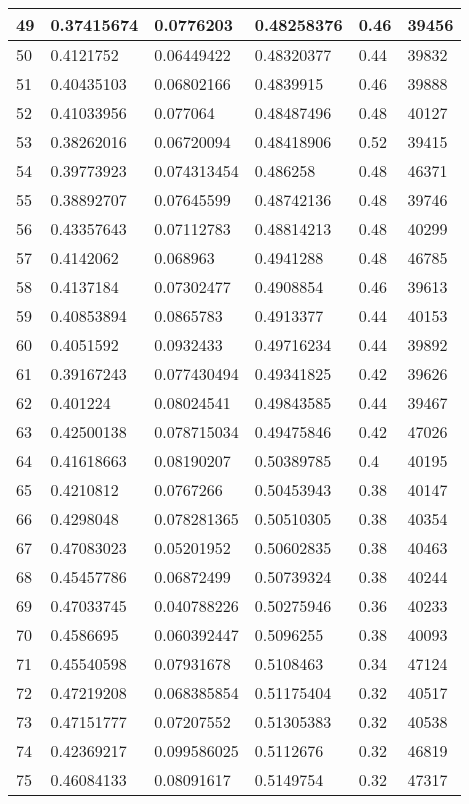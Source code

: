 \begin{longtable}{|l|l|l|l|l|l|}
49 & 0.37415674 & 0.0776203 & 0.48258376 & 0.46 & 39456 \\ \hline 
50 & 0.4121752 & 0.06449422 & 0.48320377 & 0.44 & 39832 \\ \hline 
51 & 0.40435103 & 0.06802166 & 0.4839915 & 0.46 & 39888 \\ \hline 
52 & 0.41033956 & 0.077064 & 0.48487496 & 0.48 & 40127 \\ \hline 
53 & 0.38262016 & 0.06720094 & 0.48418906 & 0.52 & 39415 \\ \hline 
54 & 0.39773923 & 0.074313454 & 0.486258 & 0.48 & 46371 \\ \hline 
55 & 0.38892707 & 0.07645599 & 0.48742136 & 0.48 & 39746 \\ \hline 
56 & 0.43357643 & 0.07112783 & 0.48814213 & 0.48 & 40299 \\ \hline 
57 & 0.4142062 & 0.068963 & 0.4941288 & 0.48 & 46785 \\ \hline 
58 & 0.4137184 & 0.07302477 & 0.4908854 & 0.46 & 39613 \\ \hline 
59 & 0.40853894 & 0.0865783 & 0.4913377 & 0.44 & 40153 \\ \hline 
60 & 0.4051592 & 0.0932433 & 0.49716234 & 0.44 & 39892 \\ \hline 
61 & 0.39167243 & 0.077430494 & 0.49341825 & 0.42 & 39626 \\ \hline 
62 & 0.401224 & 0.08024541 & 0.49843585 & 0.44 & 39467 \\ \hline 
63 & 0.42500138 & 0.078715034 & 0.49475846 & 0.42 & 47026 \\ \hline 
64 & 0.41618663 & 0.08190207 & 0.50389785 & 0.4 & 40195 \\ \hline 
65 & 0.4210812 & 0.0767266 & 0.50453943 & 0.38 & 40147 \\ \hline 
66 & 0.4298048 & 0.078281365 & 0.50510305 & 0.38 & 40354 \\ \hline 
67 & 0.47083023 & 0.05201952 & 0.50602835 & 0.38 & 40463 \\ \hline 
68 & 0.45457786 & 0.06872499 & 0.50739324 & 0.38 & 40244 \\ \hline 
69 & 0.47033745 & 0.040788226 & 0.50275946 & 0.36 & 40233 \\ \hline 
70 & 0.4586695 & 0.060392447 & 0.5096255 & 0.38 & 40093 \\ \hline 
71 & 0.45540598 & 0.07931678 & 0.5108463 & 0.34 & 47124 \\ \hline 
72 & 0.47219208 & 0.068385854 & 0.51175404 & 0.32 & 40517 \\ \hline 
73 & 0.47151777 & 0.07207552 & 0.51305383 & 0.32 & 40538 \\ \hline 
74 & 0.42369217 & 0.099586025 & 0.5112676 & 0.32 & 46819 \\ \hline 
75 & 0.46084133 & 0.08091617 & 0.5149754 & 0.32 & 47317 \\ \hline 
\end{longtable}